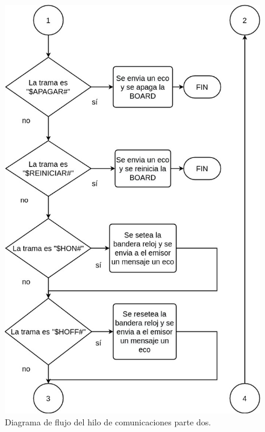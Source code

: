\begin{figure}[htpb]
	\centering
	\includegraphics[scale=0.6]{Figures/hilo2parte2.jpg} 
	\caption{Diagrama de flujo del hilo de comunicaciones parte dos.}
	\label{fig: hilocomparte2}
\end{figure}

